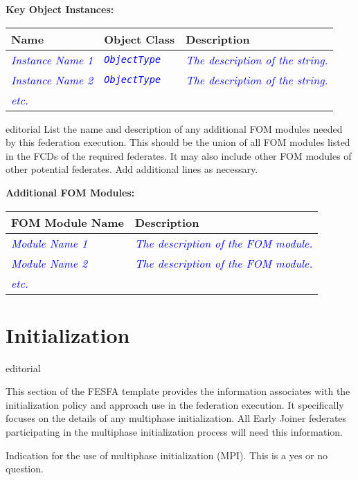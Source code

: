 \documentclass[11pt,english,letterpaper]{article}
\newcommand{\example}[1]{{\textcolor{blue}{\textit{#1}}}}
\begin{document}
\textbf{Key Object Instances: }

\begin{tabularx}{\textwidth}{|l|l|X|} \hline
Name & Object Class & Description \\ \hline
\example{Instance Name 1} & \example{\texttt{ObjectType}} &
\example{The description of the string.} \\ \hline
\example{Instance Name 2} & \example{\texttt{ObjectType}} &
\example{The description of the string.} \\ \hline
\example{etc.} & \\ \hline
\end{tabularx}

\begin{shownto}{editorial}
{\color{red} List the name and description of any additional FOM modules needed
by this federation execution. This should be the union of all FOM modules
listed in the FCDs of the required federates. It may also include other FOM
modules of other potential federates. Add additional lines as necessary.}
\end{shownto}

\textbf{Additional FOM Modules: }

\begin{tabularx}{\textwidth}{|l|X|} \hline
FOM Module Name & Description \\ \hline
\example{Module Name 1} & \example{The description of the FOM module.} \\ \hline
\example{Module Name 2} & \example{The description of the FOM module.} \\ \hline
\example{etc.} &  \\ \hline
\end{tabularx}


\section*{Initialization}

\begin{shownto}{editorial}
{\color{red} This section of the FESFA template provides the information
associates with the initialization policy and approach use in the federation
execution. It specifically focuses on the details of any multiphase
initialization. All Early Joiner federates participating in the multiphase
initialization process will need this information.

Indication for the use of multiphase initialization (MPI). This is a yes or no
question.}
\end{shownto}
\end{document}
